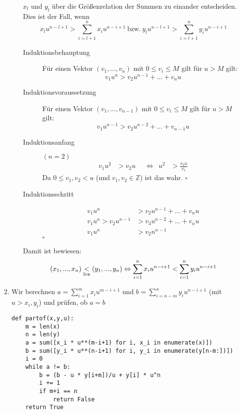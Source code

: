 \documentclass[a4paper,10pt]{scrartcl}
\begin{document}
\begin{enumerate}
\begin{enumerate}
                $x_l$ und $y_l$ über die Größenrelation der Summen zu einander entscheiden. Dies ist der Fall, wenn 
                \[x_l u^{n-l+1} > \sum\limits_{i=l+1}^{n} x_{i}u^{n-i+1}\ \text{bzw.}\ y_l u^{n-l+1} > \sum\limits_{i=l+1}^{n} y_{i}u^{n-i+1}\]
                \begin{description}
                \item[Induktionsbehauptung] Für einen Vektor $(v_1,...,v_n)$ mit $0 \leq v_i \leq M$ gilt für $u > M$ gilt:
                        \[v_1 u^n > v_2 u^{n-1} + ... + v_n u\]
                \item[Induktionsvoraussetzung] Für einen Vektor $(v_1,...,v_{n-1})$ mit $0 \leq v_i \leq M$ gilt für $u > M$ 
                        gilt:
                        \[v_1 u^{n-1} > v_2 u^{n-2} + ... + v_{n-1} u\]
                \item[Induktionsanfang] $(n = 2)$
                        \begin{align*}
                         v_1 u^2 &> v_2 u & &\Longleftrightarrow& u^2 &> \frac{v_2 u}{v_1}
                        \end{align*}
                        Da $0 \leq v_1, v_2 < u$ (und $v_1, v_2 \in \mathbb{Z}$) ist das wahr. \hfill$\square$
                \item[Induktionsschritt]
                        \begin{align*}
                         v_1 u^n &> v_2 u^{n-1} + ... + v_n u \tag{IV + Transl. $>$}\\
                         v_1 u^n > v_2 u^{n-1} &> v_3 u^{n-2} + ... + v_n u\\
                         v_1 u^n &> v_2 n^{n-1} \tag{s. IA}
                        \end{align*}
                        \hfill$\square$
                \end{description}
                Damit ist bewiesen:
                \[(x_1, ..., x_n) \underset{\text{lex}}{<} (y_1, ..., y_n) 
                        \Leftrightarrow \sum\limits_{i=1}^{n} x_{i}u^{n-i+1} < \sum\limits_{i=1}^{n} y_{i}u^{n-i+1} \]
        \end{enumerate}
\item   Wir berechnen $a = \sum\limits_{i=1}^{m} x_{i}u^{m-i+1}$ und $b = \sum\limits_{i=n-m}^{n} y_{i}u^{n-i+1}$ (mit $u > x_i, y_i$) und prüfen, 
        ob $a = b$
        \begin{lstlisting}[numbers=none]
def partof(x,y,u):
    m = len(x)
    n = len(y)
    a = sum([x_i * u**(m-i+1) for i, x_i in enumerate(x)])
    b = sum([y_i * u**(n-i+1) for i, y_i in enumerate(y[n-m:])])
    i = 0
    while a != b:
        b = (b - u * y[i+m])/u + y[i] * u^n
        i += 1
        if m+i == n
            return False
    return True
        \end{lstlisting}
\end{enumerate}
\end{document}
